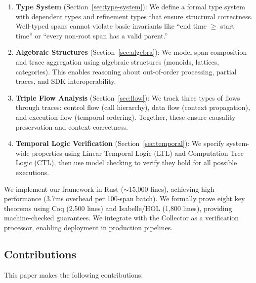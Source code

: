 \begin{enumerate}
\item \textbf{Type System} (Section~\ref{sec:type-system}): We define a formal type system with dependent types and refinement types that ensure structural correctness. Well-typed spans cannot violate basic invariants like ``end time $\geq$ start time'' or ``every non-root span has a valid parent.''

\item \textbf{Algebraic Structures} (Section~\ref{sec:algebra}): We model span composition and trace aggregation using algebraic structures (monoids, lattices, categories). This enables reasoning about out-of-order processing, partial traces, and SDK interoperability.

\item \textbf{Triple Flow Analysis} (Section~\ref{sec:flow}): We track three types of flows through traces: control flow (call hierarchy), data flow (context propagation), and execution flow (temporal ordering). Together, these ensure causality preservation and context correctness.

\item \textbf{Temporal Logic Verification} (Section~\ref{sec:temporal}): We specify system-wide properties using Linear Temporal Logic (LTL) and Computation Tree Logic (CTL), then use model checking to verify they hold for all possible executions.
\end{enumerate}

We implement our framework in Rust ($\sim$15,000 lines), achieving high performance (3.7ms overhead per 100-span batch). We formally prove eight key theorems using Coq (2,500 lines) and Isabelle/HOL (1,800 lines), providing machine-checked guarantees. We integrate with the \otel Collector as a verification processor, enabling deployment in production pipelines.

\subsection{Contributions}
\label{sec:contributions}

This paper makes the following contributions:

